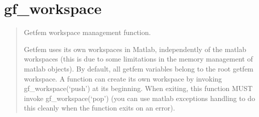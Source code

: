 \documentclass[a4paper,11pt,english]{sphinxmanual}
\begin{document}
\section{gf\_workspace}
\label{\detokenize{matlab_octave/cmdref_gf_workspace:gf-workspace}}\label{\detokenize{matlab_octave/cmdref_gf_workspace::doc}}

\begin{sphinxVerbatim}[commandchars=\\\{\}]
  \PYG{p}{[} \PYG{p}{]}
 \PYG{p}{[}\PYG{p}{]}
 
\end{sphinxVerbatim}

\begin{quote}

Getfem workspace management function.

Getfem uses its own workspaces in Matlab, independently of the
matlab workspaces (this is due to some limitations in the memory
management of matlab objects). By default, all getfem variables
belong to the root getfem workspace. A function can create its own
workspace by invoking gf\_workspace(‘push’) at its beginning. When
exiting, this function MUST invoke gf\_workspace(‘pop’) (you can
use matlab exceptions handling to do this cleanly when the
function exits on an error).
\end{quote}
\end{document}
